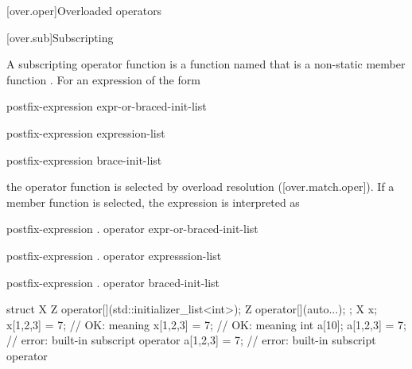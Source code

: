 \documentclass{wg21}
\begin{document}
[over.oper]{Overloaded operators}%


[over.sub]{Subscripting}%
%

\pnum
A subscripting operator function
is a function named 
that is a non-static member function .
For an expression of the form

\begin{removedblock}
\begin{ncsimplebnf}
    postfix-expression \terminal{[} expr-or-braced-init-list \terminal{]}
\end{ncsimplebnf}
\end{removedblock}

\begin{addedblock}
\begin{ncsimplebnf}
    postfix-expression \terminal{[}  expression-list\opt \terminal{]}
    
    postfix-expression \terminal{[}  brace-init-list  \terminal{]}
\end{ncsimplebnf}
\end{addedblock}

the operator function is selected by overload resolution ([over.match.oper]).
If a member function is selected, the expression is
interpreted as

\begin{removedblock}
\begin{ncsimplebnf}
    postfix-expression . operator \terminal{[}\terminal{]} \terminal{(} expr-or-braced-init-list \terminal{)}
\end{ncsimplebnf}
\end{removedblock}

\begin{addedblock}
\begin{ncsimplebnf}
     postfix-expression . operator \terminal{[}\terminal{]} \terminal{(} expresssion-list\opt \terminal{)}

      postfix-expression . operator \terminal{[}\terminal{]} \terminal{(}
      braced-init-list  \terminal{)}
\end{ncsimplebnf}
\end{addedblock}

\pnum
\begin{example}
\begin{codeblock}
    struct X {
        Z operator[](std::initializer_list<int>);
        Z operator[](auto...);
    };
    X x;
    x[{1,2,3}] = 7;                 // OK: meaning 
    x[1,2,3] = 7;                   // OK: meaning 
    int a[10];
    a[{1,2,3}] = 7;                 // error: built-in subscript operator
    a[1,2,3] = 7;                   // error: built-in subscript operator
\end{codeblock}
\end{example}
\end{document}
